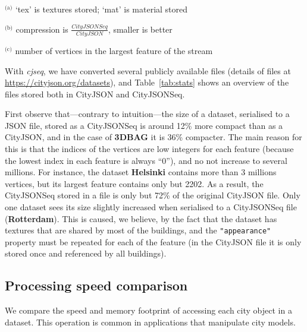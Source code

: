 \documentclass{isprs} %
\begin{document}
\begin{table}
\begin{threeparttable}
\begin{tabular}
    \bottomrule
  \end{tabular}
    \begin{tablenotes}[flushleft]
      \footnotesize
      \item ${}^{\text{(a)}}$ `tex' is textures stored; `mat' is material stored
      \item ${}^{\text{(b)}}$ compression is $\frac{CityJSONSeq}{CityJSON}$, smaller is better
      \item ${}^{\text{(c)}}$ number of vertices in the largest feature of the stream
    \end{tablenotes}
  \end{threeparttable}
\end{table}

With \emph{cjseq}, we have converted several publicly available files (details of files at \url{https://cityjson.org/datasets}), and Table~\ref{tab:stats} shows an overview of the files stored both in CityJSON and CityJSONSeq.

First observe that---contrary to intuition---the size of a dataset, serialised to a JSON file, stored as a CityJSONSeq is around 12\% more compact than as a CityJSON, and in the case of \textbf{3DBAG} it is 36\% compacter.
The main reason for this is that the indices of the vertices are low integers for each feature (because the lowest index in each feature is always ``0''), and no not increase to several millions.
For instance, the dataset \textbf{Helsinki} contains more than 3 millions vertices, but its largest feature contains only but 2202.
As a result, the CityJSONSeq stored in a file is only but 72\% of the original CityJSON file.
Only one dataset sees its size slightly increased when serialised to a CityJSONSeq file (\textbf{Rotterdam}).
This is caused, we believe, by the fact that the dataset has textures that are shared by most of the buildings, and the \texttt{"appearance"} property must be repeated for each of the feature (in the CityJSON file it is only stored once and referenced by all buildings).


\subsection{Processing speed comparison}

We compare the speed and memory footprint of accessing each city object in a dataset.
This operation is common in applications that manipulate city models.
\end{document}
